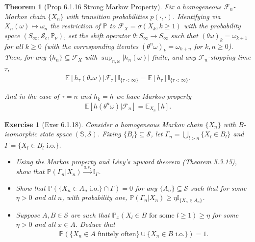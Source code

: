 \documentclass[11pt,a4paper]{article}
\numberwithin{equation}{section}%
\newtheorem{theorem}{Theorem}[]
\newtheorem{exercise}{Exercise}[]
\begin{document}
\begin{theorem}[Prop 6.1.16 Strong Markov Property]
    Fix a homogeneous $\mathcal{F}_n$-Markov chain $\{X_n\}$ with transition probabilities $p(\cdot, \cdot)$. Identifying via $X_n(\omega) \mapsto \omega_n$ the restriction of $\mathbb{P}$ to $\mathcal{F}_X = \sigma(X_k, k \geq 1)$ with the probability space $(S_{\infty}, \mathcal{S}_c, \mathbb{P}_{\nu})$, set the shift operator $\theta : S_{\infty} \to S_{\infty}$ such that $(\theta \omega)_k = \omega_{k+1}$ for all $k \geq 0$ (with the corresponding iterates $(\theta^n \omega)_k = \omega_{k+n}$ for $k, n \geq 0$). Then, for any $\{h_n\} \subseteq \mathcal{F}_X$ with $\sup_{n,\omega} |h_n(\omega)|$ finite, and any $\mathcal{F}_n$-stopping time $\tau$,
    \begin{align*}
        \mathbb{E}[h_{\tau}(\theta_{\tau} \omega) | \mathcal{F}_{\tau}] \mathbb{I}_{\{\tau < \infty\}} = \mathbb{E}[h_{\tau}] \mathbb{I}_{\{\tau < \infty\}}.
    \end{align*}

    And in the case of $ \tau = n $ and $ h_k=h $ we have Markov property
    \begin{align*}
        \mathbb{E}[h(\theta ^n\omega ) | \mathcal{F}_n] = \mathbb{E}_{X_n}[h]. 
    \end{align*}
\end{theorem}


\begin{exercise}[Exer 6.1.18]
    Consider a homogeneous Markov chain $\{X_n\}$ with $B$-isomorphic state space $(\mathbb{S}, \mathcal{S})$. Fixing $\{B_l\} \subseteq \mathcal{S}$, let $\Gamma_n = \bigcup_{l > n} \{X_l \in B_l\}$ and $\Gamma = \{X_l \in B_l \text{ i.o.}\}$.
    \begin{itemize}[topsep=0pt,itemsep=-8pt]
        \item Using the Markov property and L\'evy's upward theorem (Theorem 5.3.15), show that $\mathbb{P}(\Gamma_n | X_n) \xrightarrow{a.s.} \mathbb{I}_{\Gamma}$.
        \item Show that $\mathbb{P}(\{X_n \in A_n \text{ i.o.}\} \cap \Gamma) = 0$ for any $\{A_n\} \subseteq \mathcal{S}$ such that for some $\eta > 0$ and all $n$, with probability one, $\mathbb{P}(\Gamma_n | X_n) \geq \eta \mathbb{I}_{\{X_n \in A_n\}}$.
        \item Suppose $A, B \in \mathcal{S}$ are such that $\mathbb{P}_x(X_l \in B \text{ for some } l \geq 1) \geq \eta$ for some $\eta > 0$ and all $x \in A$. Deduce that 
        \begin{align*}
            \mathbb{P}(\{X_n \in A \text{ finitely often}\} \cup \{X_n \in B \text{ i.o.}\}) = 1. 
        \end{align*}
    \end{itemize}
\end{exercise}
\end{document}
